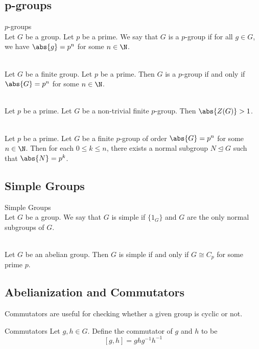 \documentclass[a4paper]{article}
\begin{document}
\subsection{p-groups}
\begin{defn}{$p$-groups}{}\\
Let $G$ be a group. Let $p$ be a prime. We say that $G$ is a $p$-group if for all $g\in G$, we have $\abs{g}=p^n$ for some $n\in\N$. 
\end{defn}

\begin{lmm}{}{}\\
Let $G$ be a finite group. Let $p$ be a prime. Then $G$ is a $p$-group if and only if $\abs{G}=p^n$ for some $n\in\N$. 
\end{lmm}

\begin{prp}{}{}\\
Let $p$ be a prime. Let $G$ be a non-trivial finite $p$-group. Then $\abs{Z(G)}>1$. 
\end{prp}

\begin{prp}{}{}\\
Let $p$ be a prime. Let $G$ be a finite $p$-group of order $\abs{G}=p^n$ for some $n\in\N$. Then for each $0\leq k\leq n$, there exists a normal subgroup $N\trianglelefteq G$ such that $\abs{N}=p^k$. 
\end{prp}

\subsection{Simple Groups}
\begin{defn}{Simple Groups}{}\\
Let $G$ be a group. We say that $G$ is simple if $\{1_G\}$ and $G$ are the only normal subgroups of $G$. 
\end{defn}

\begin{prp}{}{}\\
Let $G$ be an abelian group. Then $G$ is simple if and only if $G\cong C_p$ for some prime $p$. 
\end{prp}

\subsection{Abelianization and Commutators}
Commutators are useful for checking whether a given group is cyclic or not. 

\begin{defn}{Commutators}{} Let $g,h\in G$. Define the commutator of $g$ and $h$ to be $$[g,h]=ghg^{-1}h^{-1}$$
\end{defn}
\end{document}
